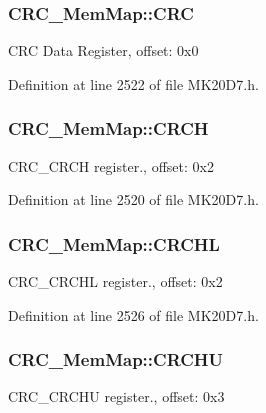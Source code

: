 \subsubsection[{\texorpdfstring{C\+RC}{CRC}}]{ C\+R\+C\+\_\+\+Mem\+Map\+::\+C\+RC}\hypertarget{struct_c_r_c___mem_map_acfe268e8629b93af602c35ce7e917bf7}{}\label{struct_c_r_c___mem_map_acfe268e8629b93af602c35ce7e917bf7}
C\+RC Data Register, offset\+: 0x0 

Definition at line 2522 of file M\+K20\+D7.\+h.

\subsubsection[{\texorpdfstring{C\+R\+CH}{CRCH}}]{ C\+R\+C\+\_\+\+Mem\+Map\+::\+C\+R\+CH}\hypertarget{struct_c_r_c___mem_map_a686eb1f6250f2141314e79ac63d07b05}{}\label{struct_c_r_c___mem_map_a686eb1f6250f2141314e79ac63d07b05}
C\+R\+C\+\_\+\+C\+R\+CH register., offset\+: 0x2 

Definition at line 2520 of file M\+K20\+D7.\+h.

\subsubsection[{\texorpdfstring{C\+R\+C\+HL}{CRCHL}}]{ C\+R\+C\+\_\+\+Mem\+Map\+::\+C\+R\+C\+HL}\hypertarget{struct_c_r_c___mem_map_af8040ed6eefc8200e2cb2564550481ab}{}\label{struct_c_r_c___mem_map_af8040ed6eefc8200e2cb2564550481ab}
C\+R\+C\+\_\+\+C\+R\+C\+HL register., offset\+: 0x2 

Definition at line 2526 of file M\+K20\+D7.\+h.

\subsubsection[{\texorpdfstring{C\+R\+C\+HU}{CRCHU}}]{ C\+R\+C\+\_\+\+Mem\+Map\+::\+C\+R\+C\+HU}\hypertarget{struct_c_r_c___mem_map_a6a8a36dbd6cc59ba899a8e7be34d05df}{}\label{struct_c_r_c___mem_map_a6a8a36dbd6cc59ba899a8e7be34d05df}
C\+R\+C\+\_\+\+C\+R\+C\+HU register., offset\+: 0x3 

